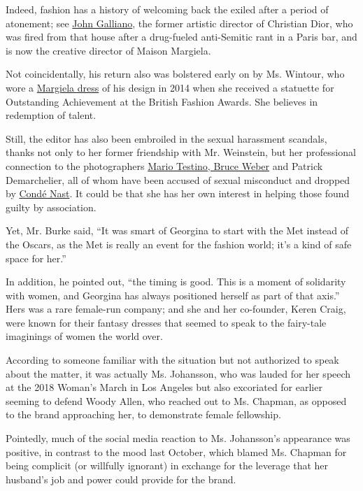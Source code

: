 Indeed, fashion has a history of welcoming back the exiled after a
period of atonement; see
\href{https://www.nytimes3xbfgragh.onion/2014/10/09/fashion/by-hiring-john-galliano-renzo-rosso-raises-eyebrows.html}{John
Galliano}, the former artistic director of Christian Dior, who was fired
from that house after a drug-fueled anti-Semitic rant in a Paris bar,
and is now the creative director of Maison Margiela.

Not coincidentally, his return also was bolstered early on by Ms.
Wintour, who wore a
\href{https://runway.blogs.nytimes3xbfgragh.onion/2014/12/02/anna-wintour-wears-john-galliano-for-margiela-at-the-british-fashion-awards/}{Margiela
dress} of his design in 2014 when she received a statuette for
Outstanding Achievement at the British Fashion Awards. She believes in
redemption of talent.

Still, the editor has also been embroiled in the sexual harassment
scandals, thanks not only to her former friendship with Mr. Weinstein,
but her professional connection to the photographers
\href{https://www.nytimes3xbfgragh.onion/2018/01/13/style/mario-testino-bruce-weber-harassment.html}{Mario
Testino, Bruce Weber} and Patrick Demarchelier, all of whom have been
accused of sexual misconduct and dropped by
\href{https://www.nytimes3xbfgragh.onion/2018/01/13/fashion/conde-nast-new-code-of-conduct-sexual-harassment-models.html}{Condé
Nast}. It could be that she has her own interest in helping those found
guilty by association.

Yet, Mr. Burke said, ``It was smart of Georgina to start with the Met
instead of the Oscars, as the Met is really an event for the fashion
world; it's a kind of safe space for her.''

In addition, he pointed out, ``the timing is good. This is a moment of
solidarity with women, and Georgina has always positioned herself as
part of that axis.'' Hers was a rare female-run company; and she and her
co-founder, Keren Craig, were known for their fantasy dresses that
seemed to speak to the fairy-tale imaginings of women the world over.

According to someone familiar with the situation but not authorized to
speak about the matter, it was actually Ms. Johansson, who was lauded
for her speech at the 2018 Woman's March in Los Angeles but also
excoriated for earlier seeming to defend Woody Allen, who reached out to
Ms. Chapman, as opposed to the brand approaching her, to demonstrate
female fellowship.

Pointedly, much of the social media reaction to Ms. Johansson's
appearance was positive, in contrast to the mood last October, which
blamed Ms. Chapman for being complicit (or willfully ignorant) in
exchange for the leverage that her husband's job and power could provide
for the brand.

